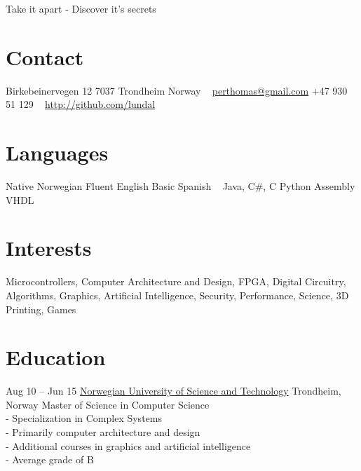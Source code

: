 \documentclass[print]{friggeri-cv}
\begin{document}
       {Take it apart - Discover it's secrets}


\begin{aside}
    \section{Contact}
        Birkebeinervegen 12
        7037 Trondheim
        Norway
        ~
        \href{mailto:perthomas@gmail.com}{perthomas@gmail.com}
        +47 930 51 129
        ~
        \href{http://github.com/lundal}{http://github.com/lundal}
    \section{Languages}
        Native Norwegian
        Fluent English
        Basic Spanish
        ~
        Java, C\#, C
        Python
        Assembly
        VHDL
\end{aside}

\section{Interests}

Microcontrollers,
Computer Architecture and Design,
FPGA,
Digital Circuitry,
Algorithms,
Graphics,
Artificial Intelligence,
Security,
Performance,
Science,
3D Printing,
Games

\section{Education}

\begin{entrylist}
    \entry
        {Aug 10 – Jun 15}
        {\href{http://ntnu.no/}{Norwegian University of Science and Technology}}
        {Trondheim, Norway}
        {Master of Science in Computer Science\\
        - Specialization in Complex Systems\\
        - Primarily computer architecture and design\\
        - Additional courses in graphics and artificial intelligence\\
        - Average grade of B}
\end{entrylist}
\end{document}
